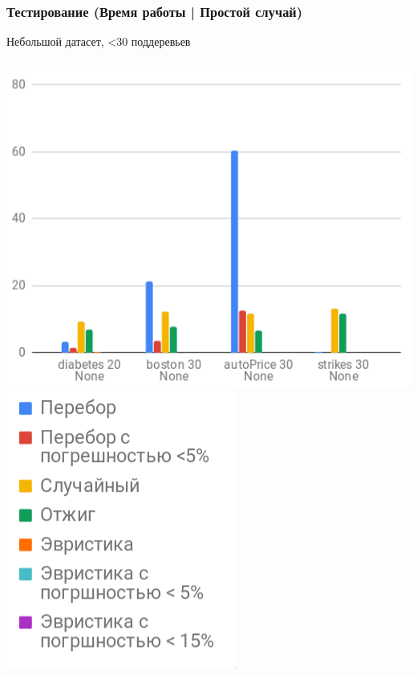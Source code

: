\documentclass{beamer}
\begin{document}
\begin{frame}
    \frametitle{Тестирование (Время работы | Простой случай)}
    Небольшой датасет, <30 поддеревьев
    \vfill
    \begin{columns}
        \includegraphics[width=\textwidth]{time_easy.png}
        \includegraphics[width=\textwidth]{time_legend.png}
    \end{columns}
\end{frame}
\end{document}
